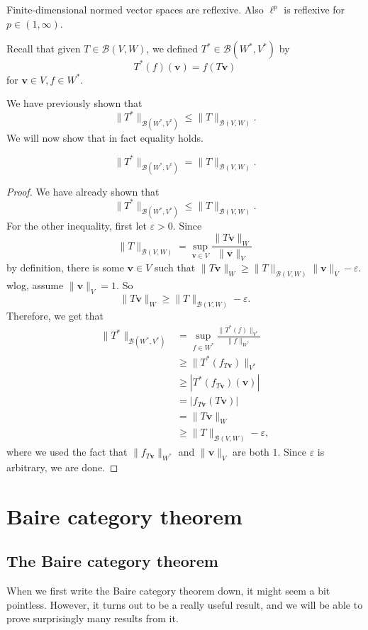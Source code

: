 \documentclass[a4paper]{article}
\begin{document}
\begin{eg}
  Finite-dimensional normed vector spaces are reflexive. Also $\ell^p$ is reflexive for $p \in (1, \infty)$.
\end{eg}

Recall that given $T\in \mathcal{B}(V, W)$, we defined $T^*\in \mathcal{B}(W^*, V^*)$ by
\[
  T^*(f)(\mathbf{v}) = f(T\mathbf{v})
\]
for $\mathbf{v}\in V, f\in W^*$.

We have previously shown that
\[
  \|T^*\|_{\mathcal{B}(W^*, V^*)} \leq \|T\|_{\mathcal{B}(V, W)}.
\]
We will now show that in fact equality holds.
\begin{prop}
  \[
    \|T^*\|_{\mathcal{B}(W^*, V^*)} = \|T\|_{\mathcal{B}(V, W)}.
  \]
\end{prop}

\begin{proof}
  We have already shown that
  \[
    \|T^*\|_{\mathcal{B}(W^*, V^*)} \leq \|T\|_{\mathcal{B}(V, W)}.
  \]
  For the other inequality, first let $\varepsilon > 0$. Since
  \[
    \|T\|_{\mathcal{B}(V, W)} = \sup_{\mathbf{v}\in V} \frac{\|T\mathbf{v}\|_W}{\|\mathbf{v}\|_V}
  \]
  by definition, there is some $\mathbf{v}\in V$ such that $\|T\mathbf{v}\|_W \geq \|T\|_{\mathcal{B}(V, W)}\|\mathbf{v}\|_V - \varepsilon$. wlog, assume $\|\mathbf{v}\|_V = 1$. So
  \[
    \|T\mathbf{v}\|_W \geq \|T\|_{\mathcal{B}(V, W)} - \varepsilon.
  \]
  Therefore, we get that
  \begin{align*}
    \|T^*\|_{\mathcal{B}(W^*, V^*)} &= \sup_{f\in W^*} \frac{\|T^*(f)\|_{V^*}}{\|f\|_{W^*}} \\
    &\geq \|T^*(f_{T\mathbf{v}})\|_{V^*} \\
    &\geq |T^*(f_{T\mathbf{v}})(\mathbf{v})| \\
    &= |f_{T\mathbf{v}}(T\mathbf{v})| \\
    &= \|T\mathbf{v}\|_W \\
    &\geq \|T\|_{\mathcal{B}(V, W)} - \varepsilon,
  \end{align*}
  where we used the fact that $\|f_{T\mathbf{v}}\|_{W^*}$ and $\|\mathbf{v}\|_V$ are both $1$. Since $\varepsilon$ is arbitrary, we are done.
\end{proof}

\section{Baire category theorem}
\subsection{The Baire category theorem}
When we first write the Baire category theorem down, it might seem a bit pointless. However, it turns out to be a really useful result, and we will be able to prove surprisingly many results from it.
\end{document}
